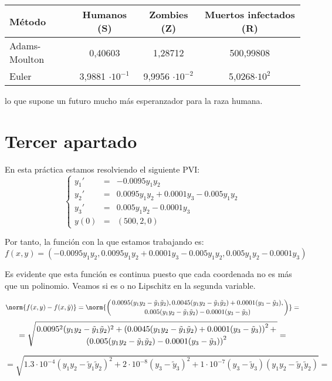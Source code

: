\documentclass[nochap]{apuntes}
\begin{document}
\begin{center}
\begin{tabular}{lccc}    \toprule
Método    & Humanos (S)  & Zombies (Z)  & Muertos infectados (R)  \\ \midrule
Adams-Moulton & 0,40603 & 1,28712 & 500,99808\\ 
Euler & 3,9881 $\cdot 10^{-1}$ & 9,9956 $\cdot 10^{-2}$ & 5,0268$\cdot 10^2$\\\bottomrule
 \hline
\end{tabular}
\end{center}

lo que supone un futuro mucho más esperanzador para la raza humana.

\section{Tercer apartado}
En esta práctica estamos resolviendo el siguiente PVI:
\[\left\{ \begin{array}{lll}
y_1'& = & -0.0095y_1y_2\\ 
y_2'& = & 0.0095y_1y_2 + 0.0001y_3 - 0.005y_1y_2\\ 
y_3'& = & 0.005y_1y_2-0.0001y_3\\ 
y(0)& = & (500,2,0)  
\end{array}\right.\]

Por tanto, la función con la que estamos trabajando es:
\[f(x,y)=(-0.0095y_1y_2,0.0095y_1y_2 + 0.0001y_3 - 0.005y_1y_2,0.005y_1y_2-0.0001y_3)\]

Es evidente que esta función es continua puesto que cada coordenada no es más que un polinomio. Veamos si es o no Lipschitz en la segunda variable.

\[\norm{f(x,y)-f(x,\tilde{y})} =\norm{\left(0.0095(y_1y_2-\tilde{y}_1\tilde{y}_2), 0.0045(y_1y_2-\tilde{y}_1\tilde{y}_2) + 0.0001(y_3-\tilde{y}_3),\atop0.005(y_1y_2-\tilde{y}_1\tilde{y}_2)-0.0001(y_3-\tilde{y}_3) \right)}=\]
\[=\sqrt{0.0095^2(y_1y_2-\tilde{y}_1\tilde{y}_2)^2 + \left(0.0045(y_1y_2-\tilde{y}_1\tilde{y}_2) + 0.0001(y_3-\tilde{y}_3) \right)^2 + \atop \left(0.005(y_1y_2-\tilde{y}_1\tilde{y}_2)-0.0001(y_3-\tilde{y}_3)\right)^2}=\]

\[=\sqrt{1.3 \cdot 10^{-4}(y_1y_2-\tilde{y}_1\tilde{y}_2)^2 + 2\cdot 10^{-8} (y_3-\tilde{y}_3)^2 + 1\cdot 10^{-7} (y_3-\tilde{y}_3)(y_1y_2-\tilde{y}_1\tilde{y}_2)} = \]
\end{document}

